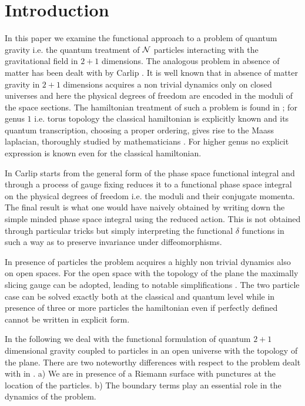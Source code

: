 \documentclass[a4paper,12pt]{article}
\begin{document}
\section{Introduction}\label{Introduction}
In this paper we examine the functional approach to a problem of
quantum gravity i.e. the quantum treatment of ${\cal N}$ particles
interacting with the gravitational field in $2+1$ dimensions. The analogous
problem in absence of matter has been dealt with by Carlip
\cite {carlip}. It is well known that in absence of matter gravity in
$2+1$ dimensions acquires a non trivial dynamics only on closed
universes and here the physical degrees of freedom are encoded in the
moduli of the space sections. The hamiltonian treatment of such a
problem is found in \cite{moncrief,hosoya,carlip2}; for genus $1$ i.e. torus
topology the classical hamiltonian is explicitly known and its
quantum transcription, choosing a proper ordering, gives rise to the
Maass laplacian, thoroughly studied by mathematicians
\cite{fayterras}. For higher 
genus no explicit expression is known even for the classical
hamiltonian.

In \cite{carlip} Carlip starts from the general form of the
phase space functional integral and through a process of gauge fixing
reduces it to a functional phase space integral on the physical
degrees of freedom i.e. the moduli and their conjugate momenta. The
final result is what one would have naively obtained by writing down
the simple minded phase space integral using the reduced action. This
is not obtained through particular tricks but simply interpreting the
functional $\delta$ functions in such a way as to preserve invariance
under diffeomorphisms. 

In presence of particles the problem acquires a highly non trivial
dynamics also on open spaces. For the open space with the
topology of the plane the maximally slicing gauge can be adopted,
leading to notable simplifications \cite{BCVW,MS,CMS1}. The two particle
case can be solved exactly both at the classical and quantum level
while in presence of three or more particles the hamiltonian even if
perfectly defined \cite{CMS1,CMS3} cannot be written in explicit form. 

In the following we deal with the functional formulation of quantum
$2+1$ dimensional gravity coupled to particles in an open universe
with the topology of the plane. There are two noteworthy differences
with respect to the problem dealt with in \cite{carlip}. a) We are in
presence of a Riemann surface with punctures at the location of the
particles. b) The boundary terms play an essential role in the
dynamics of the problem.
\end{document}

